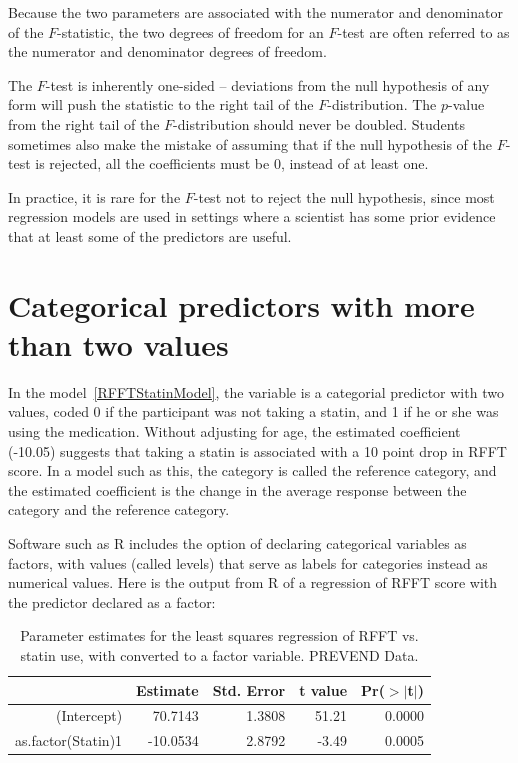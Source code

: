 Because the two parameters are associated with the numerator and denominator of the $F$-statistic, the two degrees of freedom for an $F$-test are often referred to as the numerator and denominator degrees of freedom.

The $F$-test is inherently one-sided -- deviations from the null hypothesis of any form will push the statistic to the right tail of the $F$-distribution.  The $p$-value from the right tail of the $F$-distribution should never be doubled.  Students sometimes also make the mistake of assuming that if the null hypothesis of the $F$-test is rejected, all the coefficients must be 0, instead of at least one.

In practice, it is rare for the $F$-test not to reject the null hypothesis, since most regression models are used in settings where a scientist has some prior evidence that at least some of the predictors are useful.


\section{Categorical predictors with more than two values}

In the model~\ref{RFFTStatinModel}, the variable  is a categorial predictor with two values, coded 0 if the participant was not taking a statin, and 1 if he or she was using the medication.  Without adjusting for age, the estimated coefficient (-10.05) suggests that taking a statin is associated with a 10 point drop in RFFT score.  In a model such as this, the category  is called the reference category, and the estimated coefficient is the change in the average response between the category  and the reference category.

Software such as \textsf{R} includes the option of declaring categorical variables as factors, with values (called levels) that serve as labels for categories instead as numerical values.  Here is the output from \textsf{R} of a regression of RFFT score with the predictor  declared as a factor:


\begin{table}[ht]
\centering
\begin{tabular}{rrrrr}
  \hline
 & Estimate & Std. Error & t value & Pr($>$$|$t$|$) \\ 
  \hline
(Intercept) & 70.7143 & 1.3808 & 51.21 & 0.0000 \\ 
  as.factor(Statin)1 & -10.0534 & 2.8792 & -3.49 & 0.0005 \\ 
   \hline
\end{tabular}
\caption{Parameter estimates for the least squares regression of RFFT vs. statin use,  with  converted to a factor variable.  PREVEND Data.}
\end{table} 

